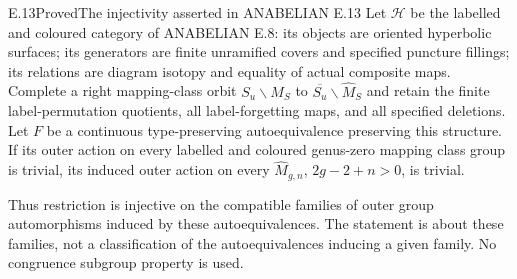 \begin{result}{E.13}{Proved}{The injectivity asserted in ANABELIAN E.13}
Let $\mathscr H$ be the labelled and coloured category of
ANABELIAN E.8: its objects are oriented hyperbolic surfaces;
its generators are finite unramified covers and specified
puncture fillings; its relations are diagram isotopy and
equality of actual composite maps.  Complete a right mapping-class
orbit $S_u\backslash M_S$ to
$\overline{S_u}\backslash\widehat M_S$ and retain the finite
label-permutation quotients, all label-forgetting maps, and all
specified deletions.  Let $F$ be a continuous type-preserving
autoequivalence preserving this structure.  If its outer action
on every labelled and coloured genus-zero mapping class group
is trivial, its induced outer action on every
$\widehat M_{g,n}$, $2g-2+n>0$, is trivial.

Thus restriction is injective on the compatible families of
outer group automorphisms induced by these autoequivalences.
The statement is about these families, not a classification of
the autoequivalences inducing a given family.  No congruence
subgroup property is used.
\end{result}
